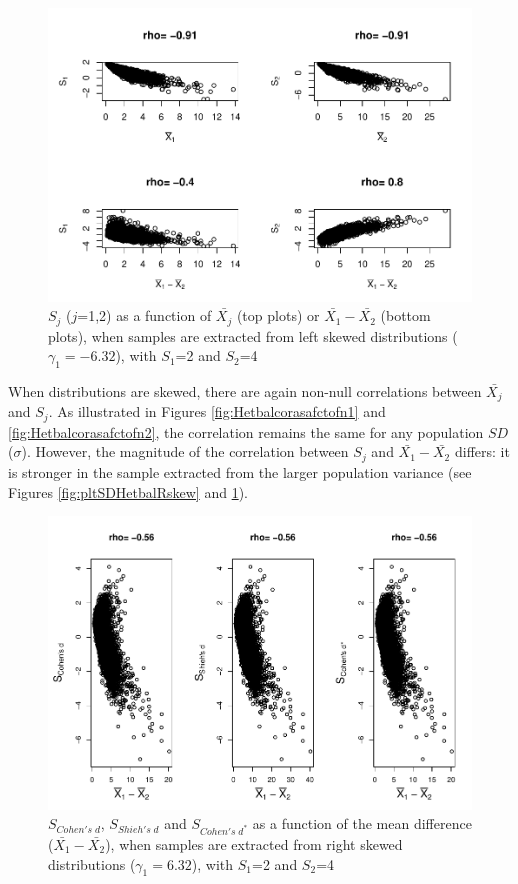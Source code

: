 \documentclass[
  english,
  man,mask,floatsintext]{apa6}
\begin{document}
\begin{figure}
\centering
\includegraphics{Correlation_files/figure-latex/pltSDHetbalLskew-1.pdf}
\caption{\label{fig:pltSDHetbalLskew}\(S_j\) (\(j\)=1,2) as a function of \(\bar{X_j}\) (top plots) or \(\bar{X_1}-\bar{X_2}\) (bottom plots), when samples are extracted from left skewed distributions (\(\gamma_1 = -6.32\)), with \(S_1\)=2 and \(S_2\)=4}
\end{figure}

When distributions are skewed, there are again non-null correlations between \(\bar{X_j}\) and \(S_j\). As illustrated in Figures \ref{fig:Hetbalcorasafctofn1} and \ref{fig:Hetbalcorasafctofn2}, the correlation remains the same for any population \(SD\) (\(\sigma\)). However, the magnitude of the correlation between \(S_j\) and \(\bar{X_1}-\bar{X_2}\) differs: it is stronger in the sample extracted from the larger population variance (see Figures \ref{fig:pltSDHetbalRskew} and \ref{fig:pltSDHetbalLskew}).

\begin{figure}
\centering
\includegraphics{Correlation_files/figure-latex/pltStdzrHetbalRskew-1.pdf}
\caption{\label{fig:pltStdzrHetbalRskew}\(S_{Cohen's \; d}\), \(S_{Shieh's \; d}\) and \(S_{Cohen's \; d^*}\) as a function of the mean difference (\(\bar{X_1}-\bar{X_2}\)), when samples are extracted from right skewed distributions (\(\gamma_1 = 6.32\)), with \(S_1\)=2 and \(S_2\)=4}
\end{figure}
\end{document}
